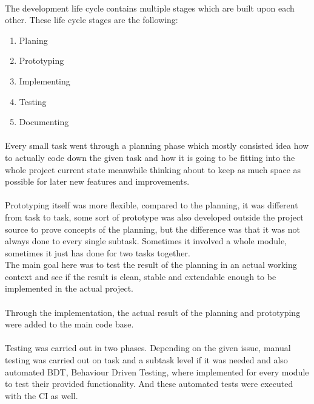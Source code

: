 \documentclass[]{report}
\begin{document}
\paragraph{ }
The development life cycle contains multiple stages which are built upon each other. These life cycle stages are the following:

\begin{enumerate}
	\item Planing
	\item Prototyping
	\item Implementing
	\item Testing
	\item Documenting
\end{enumerate}

\paragraph{ }
Every small task went through a planning phase which mostly consisted idea how to actually code down the given task and how it is going to be fitting into the whole project current state meanwhile thinking about to keep as much space as possible for later new features and improvements.

\paragraph{ }
Prototyping itself was more flexible, compared to the planning, it was different from task to task, some sort of prototype was also developed outside the project source to prove concepts of the planning, but the difference was that it was not always done to every single subtask. Sometimes it involved a whole module, sometimes it just has done for two tasks together.
\\
The main goal here was to test the result of the planning in an actual working context and see if the result is clean, stable and extendable enough to be implemented in the actual project.

\paragraph{ }
Through the implementation, the actual result of the planning and prototyping were added to the main code base.

\paragraph{ }
Testing was carried out in two phases. Depending on the given issue, manual testing was carried out on task and a subtask level if it was needed and also automated BDT, Behaviour Driven Testing, where implemented for every module to test their provided functionality. And these automated tests were executed with the CI as well.
\end{document}
